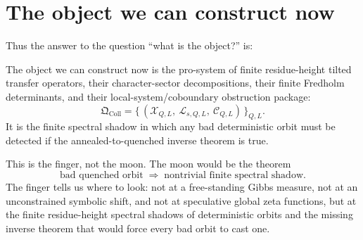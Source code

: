 \documentclass[11pt]{article}
\newcommand{\Xcal}{\mathcal{X}}
\newcommand{\Lcal}{\mathcal{L}}
\newcommand{\Ccal}{\mathscr{C}}
\newcommand{\Qcoll}{\mathfrak{Q}_{\mathrm{Coll}}}
\theoremstyle{remark}
\begin{document}
\section{The object we can construct now}

Thus the answer to the question ``what is the object?'' is:

\begin{keystatement}
The object we can construct now is the pro-system of finite residue-height tilted transfer
operators, their character-sector decompositions, their finite Fredholm determinants, and
their local-system/coboundary obstruction package:
\[
\Qcoll = \bigl\{\,(\Xcal_{Q,L},\ \Lcal_{s,Q,L},\ \Ccal_{Q,L})\,\bigr\}_{Q,L}.
\]
It is the finite spectral shadow in which any bad deterministic orbit must be detected if
the annealed-to-quenched inverse theorem is true.
\end{keystatement}

This is the finger, not the moon. The moon would be the theorem
\[
\text{bad quenched orbit}
\;\Longrightarrow\;
\text{nontrivial finite spectral shadow}.
\]
The finger tells us where to look: not at a free-standing Gibbs measure, not at an
unconstrained symbolic shift, and not at speculative global zeta functions, but at the
finite residue-height spectral shadows of deterministic orbits and the missing inverse
theorem that would force every bad orbit to cast one.
\end{document}
